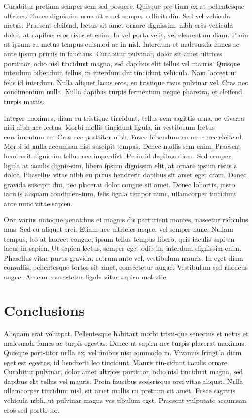 ﻿\documentclass[10pt,a4paper,twocolumn,twoside]{article}
\begin{document}
Curabitur pretium semper sem sed posuere. Quisque pre-tium ex at pellentesque ultrices. Donec dignissim urna sit amet semper sollicitudin. Sed vel vehicula metus. Praesent eleifend, lectus sit amet ornare dignissim, nibh eros vehicula dolor, at dapibus eros risus et enim. In vel porta velit, vel elementum diam. Proin at ipsum eu metus tempus euismod ac in nisl. Interdum et malesuada fames ac ante ipsum primis in faucibus. Curabitur pulvinar, dolor sit amet ultrices porttitor, odio nisl tincidunt magna, sed dapibus elit tellus vel mauris. Quisque interdum bibendum tellus, in interdum dui tincidunt vehicula. Nam laoreet ut felis id interdum. Nulla aliquet lacus eros, eu tristique risus pulvinar vel. Cras nec condimentum nulla. Nulla dapibus turpis fermentum neque pharetra, et eleifend turpis mattis. 

Integer maximus, diam eu tristique tincidunt, tellus sem sagittis urna, ac viverra nisi nibh nec lectus. Morbi mollis tincidunt ligula, in vestibulum lectus condimentum eu. Cras nec porttitor nibh. Fusce bibendum eu nunc nec eleifend. Morbi id nulla accumsan nisi suscipit tempus. Donec mollis sem enim. Praesent hendrerit dignissim tellus nec imperdiet. Proin id dapibus diam. Sed semper, ligula at iaculis dignis-sim, libero ipsum dignissim elit, at ornare ipsum risus a dolor. Phasellus vitae nibh eu purus hendrerit dapibus sit amet eget diam. Donec gravida suscipit dui, nec placerat dolor congue sit amet. Donec lobortis, justo iaculis aliquam condimen-tum, felis ligula tempor nunc, ullamcorper tincidunt ante nunc vitae sapien.

Orci varius natoque penatibus et magnis dis parturient montes, nascetur ridiculus mus. Sed eu aliquet orci. Etiam nec ultricies neque, vel semper nunc. Nullam tempus, leo at laoreet congue, ipsum tellus tempus libero, quis iaculis sapi-en lacus in sapien. Ut sapien lectus, semper eget odio in, interdum dignissim enim. Phasellus vitae purus gravida, rutrum ante vel, vestibulum mauris. In eget diam convallis, pellentesque tortor sit amet, consectetur augue. Vestibulum sed rhoncus augue. Aenean consectetur ligula vitae sapien molestie. 


\section{Conclusions}

Aliquam erat volutpat. Pellentesque habitant morbi tristi-que senectus et netus et malesuada fames ac turpis egestas. Donec ut sapien nec turpis placerat maximus. Quisque port-titor nulla ex, vel finibus nisi commodo in. Vivamus fringilla diam eget est egestas, id hendrerit leo tincidunt. Mauris tin-cidunt iaculis ornare. Curabitur pulvinar, dolor amet ultrices porttitor, odio nisl tincidunt magna, sed dapibus elit tellus vel mauris. Proin faucibus scelerisque orci vitae aliquet. Nulla ullamcorper tincidunt nisl, sit amet mollis mi pretium sit amet. Fusce sagittis vehicula nibh, ut pulvinar magna ves-tibulum eget. Praesent vulputate accumsan eros sed portti-tor. 
\end{document}

